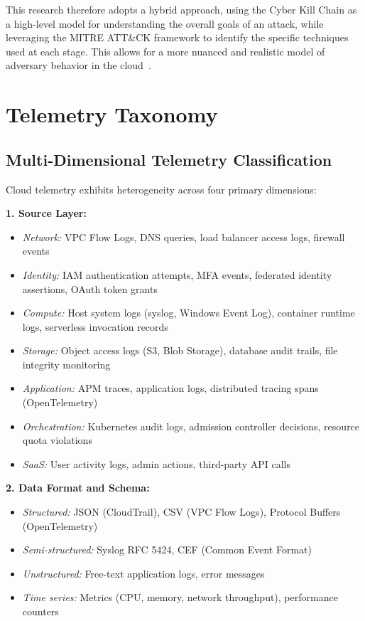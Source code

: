 This research therefore adopts a hybrid approach, using the Cyber Kill Chain as a high-level model for understanding the overall goals of an attack, while leveraging the MITRE ATT&CK framework to identify the specific techniques used at each stage. This allows for a more nuanced and realistic model of adversary behavior in the cloud~\cite{exabeam2024attack}.

\section{Telemetry Taxonomy}\label{sec:theory-telemetry}
\subsection{Multi-Dimensional Telemetry Classification}
Cloud telemetry exhibits heterogeneity across four primary dimensions:

\textbf{1. Source Layer:}
\begin{itemize}
    \item \emph{Network:} VPC Flow Logs, DNS queries, load balancer access logs, firewall events
    \item \emph{Identity:} IAM authentication attempts, MFA events, federated identity assertions, OAuth token grants
    \item \emph{Compute:} Host system logs (syslog, Windows Event Log), container runtime logs, serverless invocation records
    \item \emph{Storage:} Object access logs (S3, Blob Storage), database audit trails, file integrity monitoring
    \item \emph{Application:} APM traces, application logs, distributed tracing spans (OpenTelemetry)
    \item \emph{Orchestration:} Kubernetes audit logs, admission controller decisions, resource quota violations
    \item \emph{SaaS:} User activity logs, admin actions, third-party API calls
\end{itemize}

\textbf{2. Data Format and Schema:}
\begin{itemize}
    \item \emph{Structured:} JSON (CloudTrail), CSV (VPC Flow Logs), Protocol Buffers (OpenTelemetry)
    \item \emph{Semi-structured:} Syslog RFC 5424, CEF (Common Event Format)
    \item \emph{Unstructured:} Free-text application logs, error messages
    \item \emph{Time series:} Metrics (CPU, memory, network throughput), performance counters
\end{itemize}

